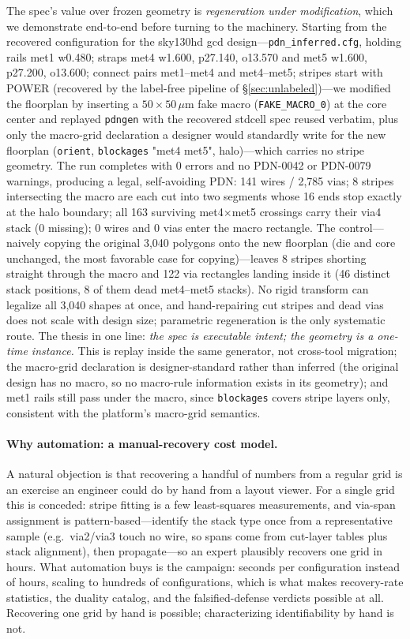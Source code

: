 \documentclass[11pt]{article}
\begin{document}
The spec's value over frozen geometry is \emph{regeneration under
modification}, which we demonstrate end-to-end before turning to the
machinery.  Starting from the recovered configuration for the sky130hd
gcd design---\texttt{pdn\_inferred.cfg}, holding rails met1 w0.480;
straps met4 w1.600, p27.140, o13.570 and met5 w1.600, p27.200, o13.600;
connect pairs met1--met4 and met4--met5; stripes start with
POWER (recovered by the label-free pipeline of \S\ref{sec:unlabeled})---we
modified the floorplan by inserting a $50\times50\,\mu$m fake macro
(\texttt{FAKE\_MACRO\_0}) at the core center and replayed
\texttt{pdngen} with the recovered stdcell spec reused verbatim, plus
only the macro-grid declaration a designer would standardly write for
the new floorplan (\texttt{orient}, \texttt{blockages} "met4 met5",
halo)---which carries no stripe geometry.  The run completes with 0
errors and no PDN-0042 or PDN-0079 warnings, producing a legal,
self-avoiding PDN: 141 wires / 2{,}785 vias; 8 stripes intersecting the
macro are each cut into two segments whose 16 ends stop exactly at the
halo boundary; all 163 surviving met4$\times$met5 crossings carry their
via4 stack (0 missing); 0 wires and 0 vias enter the macro rectangle.
The control---naively copying the original 3{,}040 polygons onto the new
floorplan (die and core unchanged, the most favorable case for
copying)---leaves 8 stripes shorting straight through the macro and 122
via rectangles landing inside it (46 distinct stack positions, 8 of them
dead met4--met5 stacks).  No rigid transform can legalize all 3{,}040
shapes at once, and hand-repairing cut stripes and dead vias does not
scale with design size; parametric regeneration is the only systematic
route.  The thesis in one line: \emph{the spec is executable intent;
the geometry is a one-time instance.}  This is replay
inside the same generator, not cross-tool migration; the macro-grid
declaration is designer-standard rather than inferred (the original
design has no macro, so no macro-rule information exists in its
geometry); and met1 rails still pass under the macro, since
\texttt{blockages} covers stripe layers only, consistent with the
platform's macro-grid semantics.

\paragraph{Why automation: a manual-recovery cost model.}  A natural
objection is that recovering a handful of numbers from a regular grid is
an exercise an engineer could do by hand from a layout viewer.  For a
single grid this is conceded: stripe fitting is a few least-squares
measurements, and via-span assignment is pattern-based---identify the
stack type once from a representative sample (e.g.\ via2/via3 touch no
wire, so spans come from cut-layer tables plus stack alignment), then
propagate---so an expert plausibly recovers one grid in hours.  What
automation buys is the campaign: seconds per configuration instead of
hours, scaling to hundreds of configurations, which is what makes
recovery-rate statistics, the duality catalog, and the falsified-defense
verdicts possible at all.  Recovering one grid by hand is possible;
characterizing identifiability by hand is not.
\end{document}
